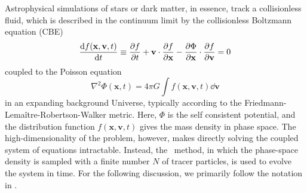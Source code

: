 Astrophysical simulations of stars or dark matter, in essence, track a collisionless fluid, which is described in the continuum limit by the collisionless Boltzmann equation (CBE)
\begin{equation}
	\frac{{\rm {d}} f(\mathbf{x}, \mathbf{v}, t)}{{\rm {d}} t}
	\equiv \frac{\partial f}{\partial t} + \mathbf{v} \cdot \frac{\partial f}{\partial \mathbf{x}}
	- \frac{\partial \Phi}{\partial \mathbf{x}} \cdot \frac{\partial f}{\partial \mathbf{v}}
	= 0
\end{equation}
coupled to the Poisson equation
\begin{equation}
	\nabla^{2} \Phi(\mathbf{x}, t) = 4 \pi G \int f(\mathbf{x}, \mathbf{v}, t) \dd \mathbf{v}
\end{equation}
in an expanding background Universe, typically according to the Friedmann-Lema\^{i}tre-Robertson-Walker metric.  Here, $\Phi$ is the self consistent potential, and the distribution function $f(\mathbf{x}, \mathbf{v}, t)$ gives the mass density in phase space.  The high-dimensionality of the problem, however, makes directly solving the coupled system of equations intractable.  Instead, the \nbody\ method, in which the phase-space density is sampled with a finite number $N$ of tracer particles, is used to evolve the system in time.  For the following discussion, we primarily follow the notation in \citet{2005MNRAS.364.1105S}.

